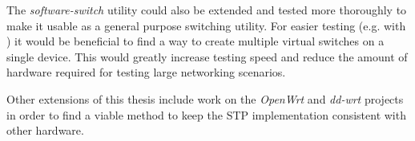 The \textit{software-switch} utility could also be extended and tested more thoroughly to make it usable as a general purpose switching utility.
For easier testing (e.g. with \tool) it would be beneficial to find a way to create multiple virtual switches on a single device.
This would greatly increase testing speed and reduce the amount of hardware required for testing large networking scenarios. 

Other extensions of this thesis include work on the \textit{OpenWrt} and \textit{dd-wrt} projects in order to find a viable method to keep the STP implementation consistent with other hardware.
